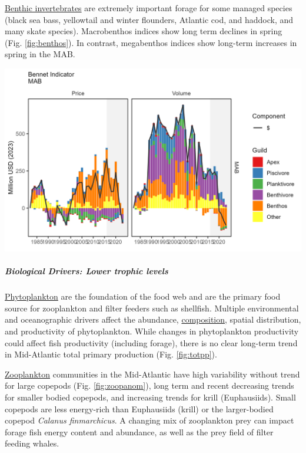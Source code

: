 \documentclass[
  10pt,
]{article}
\let\origfigure\figure
\let\endorigfigure\endfigure
\renewenvironment{figure}[1][2] {
    \expandafter\origfigure\expandafter[H]
} {
    \endorigfigure
}
\begin{document}
\href{https://noaa-edab.github.io/catalog/benthos_index.html}{Benthic invertebrates} are extremely important forage for some managed species (black sea bass, yellowtail and winter flounders, Atlantic cod, and haddock, and many skate species). Macrobenthos indices show long term declines in spring (Fig. \ref{fig:benthos}). In contrast, megabenthos indices show long-term increases in spring in the MAB.

\begin{figure}

{\centering \includegraphics[width=6.5in]{images/MidAtlantic/bennet_all_MidAtlantic_2025-09-05} 

}

\caption{Changes in spring (blue) and fall (red) benthos abundance in the MAB for megabenthos (left) and macrobenthos (right).}\label{fig:benthos}
\end{figure}

\subparagraph{Biological Drivers: Lower trophic levels}\label{biological-drivers-lower-trophic-levels}

\href{https://noaa-edab.github.io/catalog/chl_pp.html}{Phytoplankton} are the foundation of the food web and are the primary food source for zooplankton and filter feeders such as shellfish. Multiple environmental and oceanographic drivers affect the abundance, \href{https://noaa-edab.github.io/catalog/chl_pp.html}{composition}, spatial distribution, and productivity of phytoplankton. While changes in phytoplankton productivity could affect fish productivity (including forage), there is no clear long-term trend in Mid-Atlantic total primary production (Fig. \ref{fig:totpp}).

\href{https://noaa-edab.github.io/catalog/zoo_abundance_anom.html}{Zooplankton} communities in the Mid-Atlantic have high variability without trend for large copepods (Fig. \ref{fig:zoopanom}), long term and recent decreasing trends for smaller bodied copepods, and increasing trends for krill (Euphausiids). Small copepods are less energy-rich than Euphausiids (krill) or the larger-bodied copepod \emph{Calanus finmarchicus}. A changing mix of zooplankton prey can impact forage fish energy content and abundance, as well as the prey field of filter feeding whales.
\end{document}
